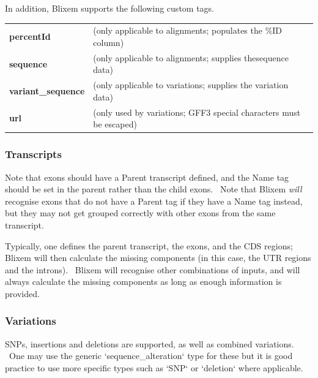 \documentclass[letterpaper]{article}
\begin{document}
{In addition, Blixem supports the following custom tags.}
\begin{center}
\begin{supertabular}{p{2.802cm}p{10.704cm}} 
\textbf{percentId} & (only applicable to alignments; populates the \%ID column) \\
\textbf{sequence } & (only applicable to alignments; supplies thesequence data) \\
\textbf{variant\_sequence} & (only applicable to variations; supplies the variation data) \\
\textbf{url } & (only used by variations; GFF3 special characters must be escaped) \\
\end{supertabular}
\end{center}

{\color[rgb]{0.30980393,0.5058824,0.7411765}\subsubsection[Transcripts]{Transcripts}}

{Note that exons should have a Parent transcript defined, and the Name
tag should be set in the parent rather than the child exons. \ Note
that Blixem \textit{will} recognise exons that do not have a Parent tag
if they have a Name tag instead, but they may not get grouped correctly
with other exons from the same transcript.}

\bigskip

{Typically, one defines the parent transcript, the exons, and the CDS
regions; Blixem will then calculate the missing components (in this
case, the UTR regions and the introns). \ Blixem will recognise other
combinations of inputs, and will always calculate the missing
components as long as enough information is provided. }

\bigskip

{\color[rgb]{0.30980393,0.5058824,0.7411765}\subsubsection[Variations]{Variations}}

{SNPs, insertions and deletions are supported, as well as combined
variations. \ One may use the generic
{\textquoteleft}sequence\_alteration{\textquoteleft} type for these but
it is good practice to use more specific types such as
{\textquoteleft}SNP{\textquoteleft} or
{\textquoteleft}deletion{\textquoteleft} where applicable.}
\end{document}
